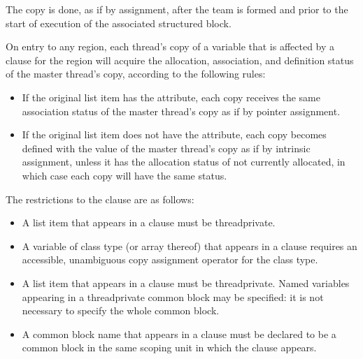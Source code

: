 \fortranspecificstart
The copy is done, as if by assignment, after the team is formed and prior to the start of 
execution of the associated structured block.

On entry to any  region, each thread’s copy of a variable that is affected by 
a  clause for the  region will acquire the allocation, association, and 
definition status of the master thread’s copy, according to the following rules:

\begin{itemize}
\item If the original list item has the  attribute, each copy receives the same 
association status of the master thread’s copy as if by pointer assignment.

\item If the original list item does not have the  attribute, each copy becomes 
defined with the value of the master thread's copy as if by intrinsic assignment, 
unless it has the allocation status of not currently allocated, in which case each copy 
will have the same status.
\end{itemize}
\fortranspecificend

\restrictions
The restrictions to the  clause are as follows:
\ccppspecificstart
\begin{itemize}
\item A list item that appears in a  clause must be threadprivate.

\item A variable of class type (or array thereof) that appears in a  clause requires 
an accessible, unambiguous copy assignment operator for the class type.
\end{itemize}
\ccppspecificend

\fortranspecificstart
\begin{itemize}
\item A list item that appears in a  clause must be threadprivate. Named variables 
appearing in a threadprivate common block may be specified: it is not necessary to 
specify the whole common block. 

\item A common block name that appears in a  clause must be declared to be a 
common block in the same scoping unit in which the  clause appears.
\end{itemize}
\fortranspecificend









